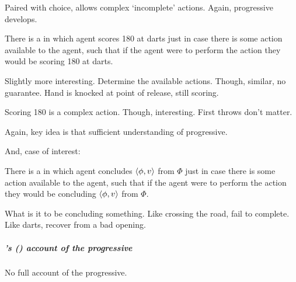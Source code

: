 \begin{note}
  Paired with choice, allows complex `incomplete' actions.
  Again, progressive develops.

  \begin{illustration}[Darts]
    There is a \pevent{} in which agent scores 180 at darts just in case there is some action available to the agent, such that if the agent were to perform the action they would be scoring 180 at darts.
  \end{illustration}

  Slightly more interesting.
  Determine the available actions.
  Though, similar, no guarantee.
  Hand is knocked at point of release, still scoring.

  Scoring 180 is a complex action.
  Though, interesting.
  First throws don't matter.

  Again, key idea is that sufficient understanding of progressive.

  And, case of interest:

  \begin{illustration}[Concluding]
    There is a \pevent{} in which agent concludes \(\langle \phi, v \rangle\) from \(\Phi\) just in case there is some action available to the agent, such that if the agent were to perform the action they would be concluding \(\langle \phi, v \rangle\) from \(\Phi\).
  \end{illustration}

  What is it to be concluding something.
  Like crossing the road, fail to complete.
  Like darts, recover from a bad opening.
\end{note}

\subparagraph{\citeauthor{Landman:1992wh}'s (\citeyear{Landman:1992wh}) account of the progressive}
\label{cha:sec:fcs-def:progressive-landman}
\nocite{Portner:1998um}
\nocite{Engelberg:1999vi}

\begin{note}
  No full account of the progressive.
\end{note}

